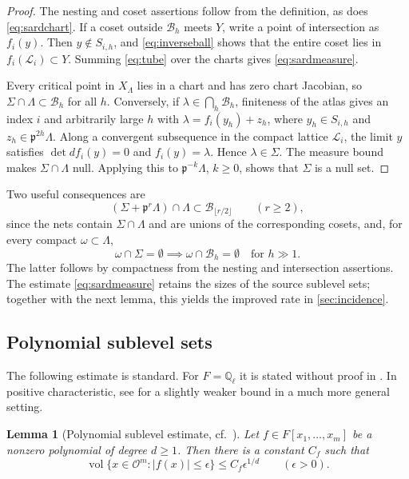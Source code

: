\documentclass[11pt,reqno]{amsart}
\numberwithin{equation}{section}
\theoremstyle{plain}
\newtheorem{lemma}[theorem]{Lemma}
\theoremstyle{definition}
\theoremstyle{remark}
\theoremstyle{plain}
\newcommand{\Q}{\mathbb{Q}}      %
\newcommand{\OO}{\mathcal{O}}    %
\newcommand{\pp}{\mathfrak{p}}   %
\newcommand{\Lat}{\mathcal{L}}   %
\newcommand{\dLat}{\Lambda}      %
\newcommand{\g}{\mathfrak{g}}    %
\newcommand{\gd}{\mathfrak{g}^*} %
\newcommand{\Bad}{\mathcal{B}}   %
\newcommand{\abs}[1]{\lvert#1\rvert}
\DeclareMathOperator{\vol}{vol}
\newcommand{\lf}{\lambda}
\newcommand{\cell}{\omega}
\newcommand{\Crv}{\Sigma}
\newcommand{\Vf}{Y}
\newcommand{\XL}{X_{\dLat}}
\begin{document}
\begin{proof}
The nesting and coset assertions follow from the definition, as does
\eqref{eq:sardchart}. If a coset outside $\Bad_h$ meets $\Vf$, write
a point of intersection as $f_i(y)$. Then $y\notin S_{i,h}$, and
\eqref{eq:inverseball} shows that the entire coset lies in
$f_i(\Lat_i)\subset\Vf$. Summing \eqref{eq:tube} over the charts
gives \eqref{eq:sardmeasure}.

Every critical point in $\XL$ lies in a chart and has zero chart
Jacobian, so $\Crv\cap\dLat\subset\Bad_h$ for all $h$.
Conversely, if $\lf\in\bigcap_h\Bad_h$, finiteness of the atlas
gives an index $i$ and arbitrarily large $h$ with
$\lf=f_i(y_h)+z_h$, where $y_h\in S_{i,h}$ and
$z_h\in\pp^{2h}\dLat$. Along a convergent subsequence in the compact
lattice $\Lat_i$, the limit $y$ satisfies
$\det df_i(y)=0$ and $f_i(y)=\lf$. Hence $\lf\in\Crv$.
The measure bound makes $\Crv\cap\dLat$ null. Applying this to
$\pp^{-k}\dLat$, $k\ge0$, shows that $\Crv$ is a null set.
\end{proof}

Two useful consequences are
\begin{equation}\label{eq:bntube}
(\Crv+\pp^r\dLat)\cap\dLat
\subset\Bad_{\lfloor r/2\rfloor}\qquad(r\ge2),
\end{equation}
since the nets contain $\Crv\cap\dLat$ and are unions of the
corresponding cosets, and, for every compact $\cell\subset\dLat$,
\begin{equation}\label{eq:bncompact}
\cell\cap\Crv=\emptyset\implies
\cell\cap\Bad_h=\emptyset\quad\text{for }h\gg1.
\end{equation}
The latter follows by compactness from the nesting and intersection
assertions. The estimate \eqref{eq:sardmeasure} retains the sizes of
the source sublevel sets; together with the next lemma, this yields
the improved rate in \cref{sec:incidence}.

\subsection{Polynomial sublevel sets}\label{sec:sublevel}

The following estimate is standard.
For $F=\Q_\ell$ it is stated without proof in \cite[\S3.2, (57)]{MR644559}.
In positive characteristic, see \cite[Theorem~1.4]{GH26} for a slightly weaker bound
in a much more general setting.

\begin{lemma}[Polynomial sublevel estimate, cf.\ {\cite[\S3.2, (57)]{MR644559}}]\label{lem:sublevel}
Let $f\in F[x_1,\dots,x_m]$ be a nonzero polynomial of degree $d\ge1$.
Then there is a constant $C_f$ such that
\[
\vol\{x\in\OO^m:\abs{f(x)}\le\epsilon\}\le C_f\epsilon^{1/d}\qquad(\epsilon>0).
\]
\end{lemma}
\end{document}
